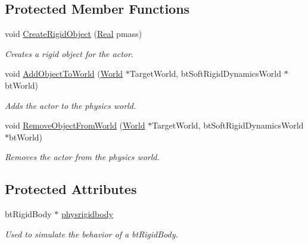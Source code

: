 \subsection*{Protected Member Functions}
\begin{DoxyCompactItemize}
\item 
void \hyperlink{classphys_1_1ActorRigid_a19227c52b972cd96ad69a7b6273e2bbf}{CreateRigidObject} (\hyperlink{namespacephys_af7eb897198d265b8e868f45240230d5f}{Real} pmass)
\begin{DoxyCompactList}\small\item\em Creates a rigid object for the actor. \item\end{DoxyCompactList}\item 
void \hyperlink{classphys_1_1ActorRigid_a3c56eb06fe6a7d468b7a67c45ade7be4}{AddObjectToWorld} (\hyperlink{classphys_1_1World}{World} $\ast$TargetWorld, btSoftRigidDynamicsWorld $\ast$btWorld)
\begin{DoxyCompactList}\small\item\em Adds the actor to the physics world. \item\end{DoxyCompactList}\item 
void \hyperlink{classphys_1_1ActorRigid_a74a4eaa5491b90a977e9db0457271f31}{RemoveObjectFromWorld} (\hyperlink{classphys_1_1World}{World} $\ast$TargetWorld, btSoftRigidDynamicsWorld $\ast$btWorld)
\begin{DoxyCompactList}\small\item\em Removes the actor from the physics world. \item\end{DoxyCompactList}\end{DoxyCompactItemize}
\subsection*{Protected Attributes}
\begin{DoxyCompactItemize}
\item 
\hypertarget{classphys_1_1ActorRigid_a690889f942e177644f4f8521f509c88d}{
btRigidBody $\ast$ \hyperlink{classphys_1_1ActorRigid_a690889f942e177644f4f8521f509c88d}{physrigidbody}}
\label{d8/d71/classphys_1_1ActorRigid_a690889f942e177644f4f8521f509c88d}

\begin{DoxyCompactList}\small\item\em Used to simulate the behavior of a btRigidBody. \item\end{DoxyCompactList}\end{DoxyCompactItemize}


